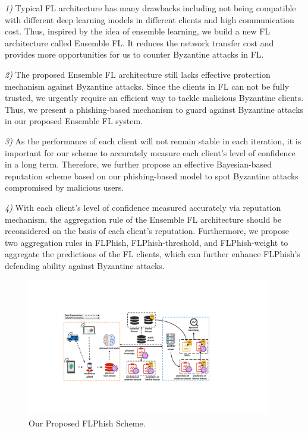 \documentclass[journal]{IEEEtran}
\begin{document}
\par \textit{1)} Typical FL architecture has many drawbacks including not being compatible with different deep learning models in different clients and high communication cost. Thus, inspired by the idea of ensemble learning, we build a new FL architecture called Ensemble FL. It reduces the network transfer cost and provides more opportunities for us to counter Byzantine attacks in FL.
\par \textit{2)} The proposed Ensemble FL architecture still lacks effective protection mechanism against Byzantine attacks. Since the clients in FL can not be fully trusted, we urgently require an efficient way to tackle malicious Byzantine clients. Thus, we present a phishing-based mechanism to guard against Byzantine attacks in our proposed Ensemble FL system.
\par \textit{3)} As the performance of each client will not remain stable in each iteration, it is important for our scheme to accurately measure each client's level of confidence in a long term. Therefore, we further propose an effective Bayesian-based reputation scheme based on our phishing-based model to spot Byzantine attacks compromised by malicious users.
\par \textit{4)} With each client's level of confidence measured accurately via reputation mechanism, the aggregation rule of the Ensemble FL architecture should be reconsidered on the basis of each client's reputation. Furthermore, we propose two aggregation rules in FLPhish, FLPhish-threshold, and FLPhish-weight to aggregate the predictions of the FL clients, which can further enhance FLPhish's defending ability against Byzantine attacks.


  \begin{figure}
    \centering
  \includegraphics[width=0.95\textwidth]{figures/Figure_FLPhish.pdf}
  \caption{Our Proposed FLPhish Scheme.}
  \label{fig_Phishing}
  \end{figure}   
  
\end{document}
